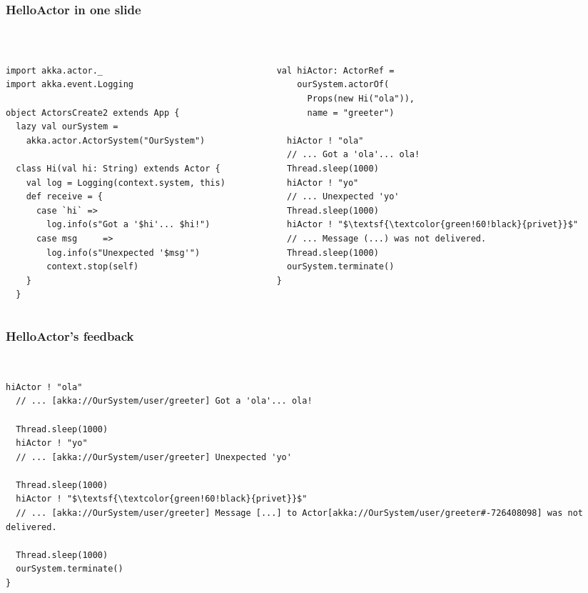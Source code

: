 \documentclass[aspectratio=169]{beamer}
\begin{document}
\begin{frame}[fragile]\frametitle{HelloActor in one slide}
~\\[-6mm]
\begin{columns}
\begin{column}{0.58\textwidth}
\begin{lstlisting}[emph={Actor, Logging, Props, receive, stop, log, terminate, actorOf}]
import akka.actor._
import akka.event.Logging

object ActorsCreate2 extends App {
  lazy val ourSystem =
    akka.actor.ActorSystem("OurSystem")

  class Hi(val hi: String) extends Actor {
    val log = Logging(context.system, this)
    def receive = {
      case `hi` =>
        log.info(s"Got a '$hi'... $hi!")
      case msg     =>
        log.info(s"Unexpected '$msg'")
        context.stop(self)
    }
  }
\end{lstlisting}
\end{column}
\begin{column}{0.42\textwidth}
\begin{lstlisting}[emph={Actor, Logging, Props, receive, stop, log, terminate, actorOf},mathescape=true]
  val hiActor: ActorRef =
    ourSystem.actorOf(
      Props(new Hi("ola")),
      name = "greeter")

  hiActor ! "ola"
  // ... Got a 'ola'... ola!
  Thread.sleep(1000)
  hiActor ! "yo"
  // ... Unexpected 'yo'
  Thread.sleep(1000)
  hiActor ! "$\textsf{\textcolor{green!60!black}{privet}}$" 
  // ... Message (...) was not delivered.
  Thread.sleep(1000)
  ourSystem.terminate()
}
\end{lstlisting} %
\end{column}
\end{columns}
\end{frame}

\begin{frame}[fragile]\frametitle{HelloActor's feedback}
~\\[-6mm]
\begin{lstlisting}[emph={Actor, Logging, Props, receive, stop, log, terminate, actorOf},mathescape=true]
  hiActor ! "ola"
  // ... [akka://OurSystem/user/greeter] Got a 'ola'... ola!

  Thread.sleep(1000)
  hiActor ! "yo"
  // ... [akka://OurSystem/user/greeter] Unexpected 'yo'

  Thread.sleep(1000)
  hiActor ! "$\textsf{\textcolor{green!60!black}{privet}}$" 
  // ... [akka://OurSystem/user/greeter] Message [...] to Actor[akka://OurSystem/user/greeter#-726408098] was not delivered.

  Thread.sleep(1000)
  ourSystem.terminate()
}
\end{lstlisting} %
\end{frame}
\end{document}
